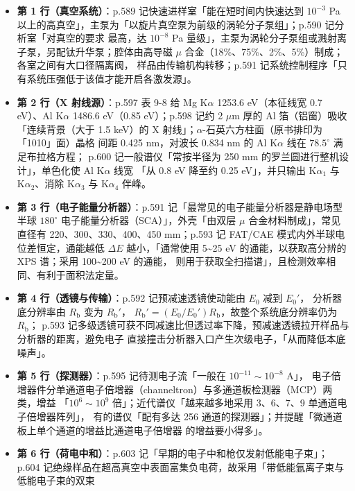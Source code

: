 \begin{itemize}
\item \textbf{第 1 行（真空系统）}：p.589 记快速进样室「能在短时间内快速达到 $10^{-3}$ Pa
以上的高真空」，主泵为「以旋片真空泵为前级的涡轮分子泵组」；p.590 记分析室「对真空的要求
最高，达 $10^{-8}$ Pa 量级」，主泵为涡轮分子泵组或溅射离子泵，另配钛升华泵；腔体由高导磁
$\mu$ 合金（18\%、75\%、2\%、5\%）制成；各室之间有大口径隔离阀，
样品由传输机构转移；p.591 记系统控制程序「只有系统压强低于该值才能开启各激发源」。
\item \textbf{第 2 行（X 射线源）}：p.597 表 9-8 给 Mg K$\alpha$ 1253.6 eV（本征线宽
0.7 eV）、Al K$\alpha$ 1486.6 eV（0.85 eV）；p.598 记约 2 $\mu$m 厚的 Al 箔（铝窗）吸收
「连续背景（大于 1.5 keV）的 X 射线」；$\alpha$-石英六方柱面（原书排印为「1010」面）晶格
间距 0.425 nm，对波长 0.834 nm 的 Al K$\alpha$ 线在 $78.5^{\circ}$ 满足布拉格方程；
p.600 记一般谱仪「常按半径为 250 mm 的罗兰圆进行整机设计」，单色化使 Al K$\alpha$ 线宽
「从 0.8 eV 降至约 0.25 eV」，并只输出 K$\alpha_{1}$ 与 K$\alpha_{2}$、消除
K$\alpha_{3}$ 与 K$\alpha_{4}$ 伴峰。
\item \textbf{第 3 行（电子能量分析器）}：p.591 记「最常见的电子能量分析器是静电场型半球
$180^{\circ}$ 电子能量分析器（SCA）」，外壳「由双层 $\mu$ 合金材料制成」，常见直径有
220、300、330、400、450 mm；p.593 记 FAT/CAE 模式内外半球电位差恒定，通能越低 $\Delta E$
越小，「通常使用 5\~{}25 eV 的通能，以获取高分辨的 XPS 谱；采用 100\~{}200 eV 的通能，
则用于获取全扫描谱」，且检测效率相同、有利于面积法定量。
\item \textbf{第 4 行（透镜与传输）}：p.592 记预减速透镜使动能由 $E_{0}$ 减到 $E_{0}'$，
分析器底分辨率由 $R_{\mathrm{b}}$ 变为 $R_{\mathrm{b}}'$，
$R_{\mathrm{b}}'=(E_{0}/E_{0}')R_{\mathrm{b}}$，故整个系统底分辨率仍为 $R_{\mathrm{b}}$；
p.593 记多级透镜可获不同减速比但透过率下降，预减速透镜拉开样品与分析器的距离，避免电子
直接撞击分析器入口产生次级电子，「从而降低本底噪声」。
\item \textbf{第 5 行（探测器）}：p.595 记待测电子流「一般在 $10^{-11}\sim10^{-8}$ A」，
电子倍增器件分单通道电子倍增器（channeltron）与多通道板检测器（MCP）两类，增益
「$10^{6}\sim10^{9}$ 倍」；近代谱仪「越来越多地采用 3、6、7、9 单通道电子倍增器阵列」，
有的谱仪「配有多达 256 通道的探测器」；并提醒「微通道板上单个通道的增益比通道电子倍增器
的增益要小得多」。
\item \textbf{第 6 行（荷电中和）}：p.603 记「早期的电子中和枪仅发射低能电子束」；
p.604 记绝缘样品在超高真空中表面富集负电荷，故采用「带低能氩离子束与低能电子束的双束

\end{itemize}

